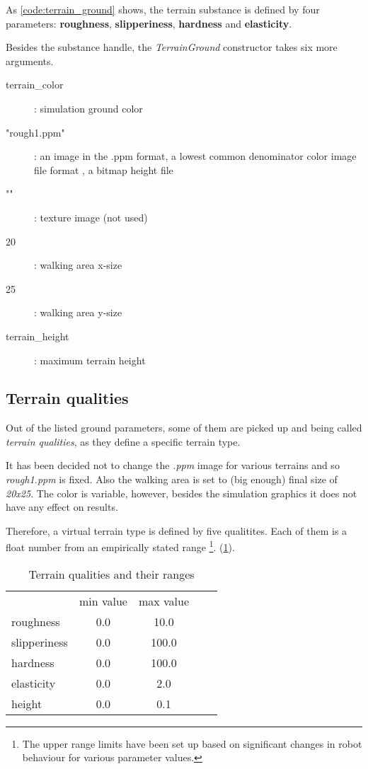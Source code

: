 As \cref{code:terrain_ground} shows, the terrain substance is defined by four parameters: \textbf{roughness}, \textbf{slipperiness}, \textbf{hardness} and \textbf{elasticity}.

Besides the substance handle, the \textit{TerrainGround} constructor takes six more arguments.

\begin{description}
\item[terrain\_color] : simulation ground color
\item["rough1.ppm"] : an image in the .ppm format, a lowest common denominator color image file format \citep{misc:ppm}, a bitmap height file
\item[""] : texture image (not used)
\item[20] : walking area x-size 
\item[25] : walking area y-size
\item[terrain\_height] : maximum terrain height
\end{description}

\subsection*{Terrain qualities}
Out of the listed ground parameters, some of them are picked up and being called \textit{terrain qualities}, as they define a specific terrain type.

It has been decided not to change the \textit{.ppm} image for various terrains and so \textit{rough1.ppm} is fixed. Also the walking area is set to (big enough) final size of \textit{20x25}. The color is variable, however, besides the simulation graphics it does not have any effect on results. 

Therefore, a virtual terrain type is defined by five qualitites. Each of them is a float number from an empirically stated range \footnote{The upper range limits have been set up based on significant changes in robot behaviour for various parameter values.}. (\cref{tab:terrain_qualities}).

\begin{table}[H]
\centering
\caption{Terrain qualities and their ranges}
\label{tab:terrain_qualities}
\begin{tabular}{lccll}
             & min value & max value \\
roughness    & 0.0       & 10.0      \\
slipperiness & 0.0       & 100.0     \\
hardness     & 0.0       & 100.0     \\
elasticity   & 0.0       & 2.0       \\
height       & 0.0       & 0.1 
\end{tabular}
\end{table}

